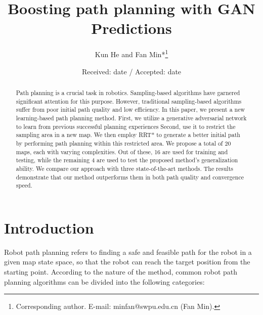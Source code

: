 \documentclass[smallcondensed]{svjour3}     %
\begin{document}
\title{Boosting path planning with GAN Predictions}

\author{Kun He and Fan Min*\thanks{Corresponding author. E-mail: minfan@swpu.edu.cn (Fan Min).} }

\date{Received: date / Accepted: date}

\maketitle

\begin{abstract}
Path planning is a crucial task in robotics.
Sampling-based algorithms have garnered significant attention for this purpose. 
However, traditional sampling-based algorithms suffer from poor initial path quality and low efficiency. 
In this paper, we present a new learning-based path planning method. 
First, we utilize a generative adversarial network to learn from previous successful planning experiences
Second, use it to restrict the sampling area in a new map. 
We then employ RRT* to generate a better initial path by performing path planning within this restricted area. 
We propose a total of 20 maps, each with varying complexities. 
Out of these, 16 are used for training and testing, while the remaining 4 are used to test the proposed method's generalization ability. 
We compare our approach with three state-of-the-art methods.
The results demonstrate that our method outperforms them in both path quality and convergence speed.
\end{abstract}

\section{Introduction}\label{sec:introduction}
Robot path planning refers to finding a safe and feasible path for the robot in a given map state space, so that the robot can reach the target position from the starting point. 
According to the nature of the method, common robot path planning algorithms can be divided into the following categories:
\end{document}
